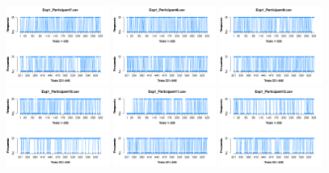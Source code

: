 \begin{itemize}
\begin{figure}[th]
\includegraphics[width=0.30\textwidth]{Figures/Response_Exp1_P7} \includegraphics[width=0.30\textwidth]{Figures/Response_Exp1_P8} \includegraphics[width=0.30\textwidth]{Figures/Response_Exp1_P9}
\includegraphics[width=0.30\textwidth]{Figures/Response_Exp1_P10} \includegraphics[width=0.30\textwidth]{Figures/Response_Exp1_P11} \includegraphics[width=0.30\textwidth]{Figures/Response_Exp1_P12}

\end{figure}
\end{itemize}
